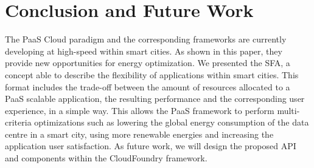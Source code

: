\section{Conclusion and Future Work}
\label{sec: conclusion}

The PaaS Cloud paradigm and the corresponding frameworks are currently developing at high-speed within smart cities.
As shown in this paper, they provide new opportunities for energy optimization.
We presented the SFA, a concept able to describe the flexibility of applications within smart cities.
This format includes the trade-off between the amount of resources allocated to a PaaS scalable application, the resulting performance and the corresponding user experience, in a simple way.
This allows the PaaS framework to perform multi-criteria optimizations such as lowering the global energy consumption of the data centre in a smart city, using more renewable energies and increasing the application user satisfaction.
As future work, we will design the proposed API and components within the CloudFoundry framework.